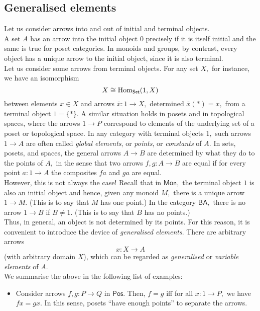 \begin{enumerate}
\subsection{Generalised elements}
Let us consider arrows into and out of initial and terminal objects.\\
A set $A$ has an arrow into the initial object $0$ precisely if it is itself initial and the same is true for poset categories. In monoids and groups, by contrast, every object has a unique arrow to the initial object, since it is also terminal.\\
Let us consider some arrows from terminal objects. For any set $X,$ for instance, we have an isomorphism
\begin{equation*} 
	X \cong \operatorname{Hom}_{\mathsf{Set}}(1, X)
\end{equation*}
between elements $x \in X$ and arrows $\bar{x}:1\to X,$ determined $\bar{x}(*) = x,$ from a terminal object $1 = \{*\}.$ A similar situation holds in posets and in topological spaces, where the arrows $1\to P$ correspond to elements of the underlying set of a poset or topological space. In any category with terminal objects $1,$ such arrows $1 \to A$ are often called \emph{global elements}, or \emph{points}, or \emph{constants} of $A.$ In sets, posets, and spaces, the general arrows $A \to B$ are determined by what they do to the points of $A,$ in the sense that two arrows $f, g: A \to B$ are equal if for every point $a:1 \to A$ the composites $fa$ and $ga$ are equal.\\
However, this is not always the case! Recall that in $\mathsf{Mon},$ the terminal object $1$ is also an initial object and hence, given any monoid $M,$ there is a unique arrow $1\to M.$ (This is to say that $M$ has one point.) In the category $\mathsf{BA},$ there is no arrow $1 \to B$ if $B \neq 1.$ (This is to say that $B$ has no points.)\\
Thus, in general, an object is not determined by its points. For this reason, it is convenient to introduce the device of \emph{generalised elements}. There are arbitrary arrows
\begin{equation*} 
	x : X \to A
\end{equation*}
(with arbitrary domain $X$), which can be regarded as \emph{generalised} or \emph{variable elements} of $A.$\\
We summarise the above in the following list of examples:\\
\example{}
\begin{itemize}
	\item Consider arrows $f, g: P\to Q$ in $\mathsf{Pos}.$ Then, $f = g$ iff for all $x:1 \to P,$ we have $fx = gx.$ In this sense, posets ``have enough points'' to separate the arrows.

\end{itemize}
\end{enumerate}
